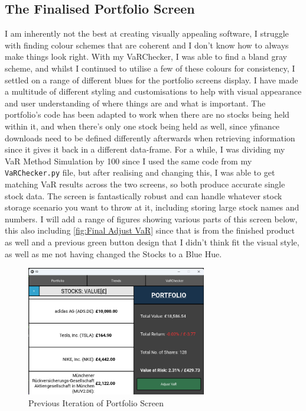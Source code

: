\documentclass{article}
\begin{document}
\subsection{The Finalised Portfolio Screen}
I am inherently not the best at creating visually appealing software, I struggle with finding colour schemes that are coherent and I don't know how to always make things look right. With my VaRChecker, I was able to find a bland gray scheme, and whilst I continued to utilise a few of these colours for consistency, I settled on a range of different blues for the portfolio screens display. I have made a multitude of different styling and customisations to help with visual appearance and user understanding of where things are and what is important. The portfolio's code has been adapted to work when there are no stocks being held within it, and when there's only one stock being held as well, since yfinance downloads need to be defined differently afterwards when retrieving information since it gives it back in a different data-frame. For a while, I was dividing my VaR Method Simulation by 100 since I used the same code from my \texttt{VaRChecker.py} file, but after realising and changing this, I was able to get matching VaR results across the two screens, so both produce accurate single stock data. The screen is fantastically robust and can handle whatever stock storage scenario you want to throw at it, including storing large stock names and numbers. I will add a range of figures showing various parts of this screen below, this also including \ref{fig:Final Adjust VaR} since that is from the finished product as well and a previous green button design that I didn't think fit the visual style, as well as me not having changed the Stocks to a Blue Hue.\\\vspace{0.3cm}

\begin{figure}[h]
  \centering
  \includegraphics[width=0.7\textwidth]{Images/Term 2 Images/image (8).png}
  \caption{Previous Iteration of Portfolio Screen}
  \label{fig:Previous Iteration}
\end{figure}
\end{document}
